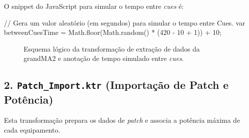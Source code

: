 \documentclass[a4paper, 12pt]{article}
\begin{document}
	O snippet do JavaScript para simular o tempo entre \textit{cues} é:
\noindent
\begin{KettleCode}
// Gera um valor aleatório (em segundos) para simular o tempo entre Cues.
var betweenCuesTime = Math.floor(Math.random() * (420 - 10 + 1)) + 10;
\end{KettleCode}


	
	\begin{figure}[h!]
		\centering
		\caption{Esquema lógico da transformação de extração de dados da grandMA2 e anotação de tempo simulado entre \textit{cues}.}
		\label{fig:get_cuedata_flow}
	\end{figure}
	\newpage
	
	\subsection{2. \texttt{Patch\_Import.ktr} (Importação de Patch e Potência)}
	Esta transformação prepara os dados de \textit{patch} e associa a potência máxima de cada equipamento.
	
\end{document}
